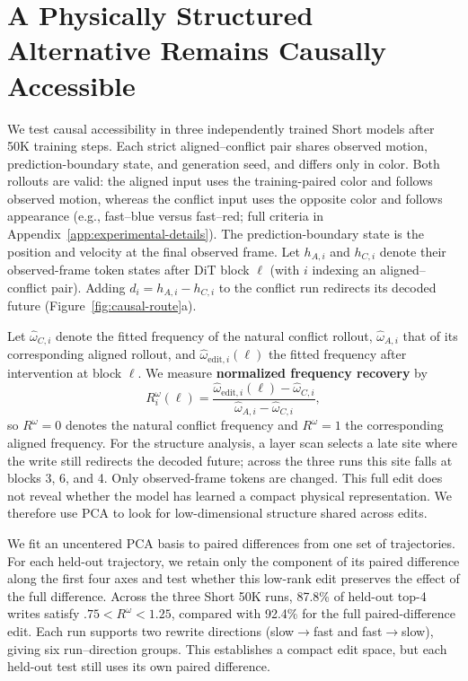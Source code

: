 \documentclass{article}
\newcommand{\resultlead}[1]{\par\noindent{\bfseries #1}\hspace{0.35em}}
\begin{document}
\section{A Physically Structured Alternative Remains Causally Accessible}
\label{sec:causal-route}

We test causal accessibility in three independently trained Short models after 50K training steps. Each
strict aligned--conflict pair shares observed motion, prediction-boundary state,
and generation seed, and differs only in color. Both rollouts are valid: the
aligned input uses the training-paired color and follows observed motion,
whereas the conflict input uses the opposite color and follows appearance
(e.g., fast--blue versus fast--red; full criteria in
Appendix~\ref{app:experimental-details}). The prediction-boundary state is the
position and velocity at the final observed frame. Let $h_{A,i}$ and
$h_{C,i}$ denote their observed-frame token states after DiT block $\ell$
(with $i$ indexing an aligned--conflict pair).
Adding $d_i=h_{A,i}-h_{C,i}$ to the conflict run redirects its decoded future
(Figure~\ref{fig:causal-route}a).

Let $\hat\omega_{C,i}$ denote the fitted frequency of the natural conflict
rollout, $\hat\omega_{A,i}$ that of its corresponding aligned rollout, and
$\hat\omega_{\mathrm{edit},i}(\ell)$ the fitted frequency after intervention at
block $\ell$. We measure \textbf{normalized frequency recovery} by
\[
R_i^\omega(\ell)=
\frac{\hat\omega_{\mathrm{edit},i}(\ell)-\hat\omega_{C,i}}
     {\hat\omega_{A,i}-\hat\omega_{C,i}},
\]
so $R^\omega=0$ denotes the natural conflict frequency and $R^\omega=1$ the
corresponding aligned frequency. For the structure analysis, a layer scan
selects a late site where the write still redirects the decoded future; across
the three runs this site falls at blocks 3, 6, and 4. Only observed-frame tokens are
changed. This full edit does not reveal whether the model has learned a compact
physical representation. We therefore use PCA to look for low-dimensional
structure shared across edits.

\resultlead{Four coordinates retain nearly the full effect.} We fit an uncentered
PCA basis to paired differences from one set of trajectories. For each held-out
trajectory, we retain only the component of its paired difference along the
first four axes and test whether this low-rank edit preserves the effect of the
full difference. Across the three Short 50K runs, 87.8\% of held-out top-4 writes satisfy
$.75<R^\omega<1.25$, compared with 92.4\% for the full paired-difference edit.
Each run supports two rewrite directions (slow$\to$fast and fast$\to$slow), giving
six run--direction groups. This establishes a compact edit space, but each
held-out test still uses its own paired difference.
\end{document}
